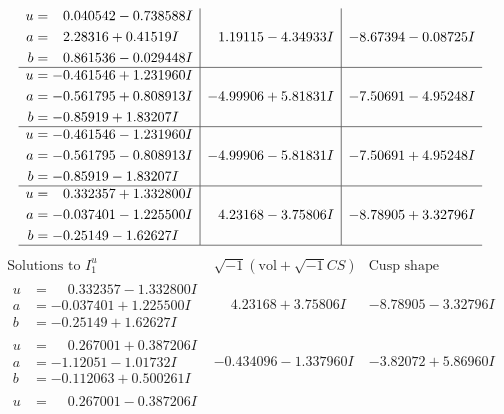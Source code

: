 \documentclass[1p]{elsarticle_modified}
\theoremstyle{definition}
\newcommand{\I}{\sqrt{-1}}
\begin{document}
$$\begin{array}{c|c|c}
\begin{aligned}
u &= \phantom{-}0.040542 - 0.738588 I \\
a &= \phantom{-}2.28316 + 0.41519 I \\
b &= \phantom{-}0.861536 - 0.029448 I\end{aligned}
 & \phantom{-}1.19115 - 4.34933 I & -8.67394 - 0.08725 I \\ \hline\begin{aligned}
u &= -0.461546 + 1.231960 I \\
a &= -0.561795 + 0.808913 I \\
b &= -0.85919 + 1.83207 I\end{aligned}
 & -4.99906 + 5.81831 I & -7.50691 - 4.95248 I \\ \hline\begin{aligned}
u &= -0.461546 - 1.231960 I \\
a &= -0.561795 - 0.808913 I \\
b &= -0.85919 - 1.83207 I\end{aligned}
 & -4.99906 - 5.81831 I & -7.50691 + 4.95248 I \\ \hline\begin{aligned}
u &= \phantom{-}0.332357 + 1.332800 I \\
a &= -0.037401 - 1.225500 I \\
b &= -0.25149 - 1.62627 I\end{aligned}
 & \phantom{-}4.23168 - 3.75806 I & -8.78905 + 3.32796 I\\
 \hline 
 \end{array}$$\newpage$$\begin{array}{c|c|c}  
\text{Solutions to }I^u_{1}& \I (\text{vol} + \sqrt{-1}CS) & \text{Cusp shape}\\
 \hline 
\begin{aligned}
u &= \phantom{-}0.332357 - 1.332800 I \\
a &= -0.037401 + 1.225500 I \\
b &= -0.25149 + 1.62627 I\end{aligned}
 & \phantom{-}4.23168 + 3.75806 I & -8.78905 - 3.32796 I \\ \hline\begin{aligned}
u &= \phantom{-}0.267001 + 0.387206 I \\
a &= -1.12051 - 1.01732 I \\
b &= -0.112063 + 0.500261 I\end{aligned}
 & -0.434096 - 1.337960 I & -3.82072 + 5.86960 I \\ \hline\begin{aligned}
u &= \phantom{-}0.267001 - 0.387206 I \\

\end{aligned}
\end{array}$$
\end{document}
